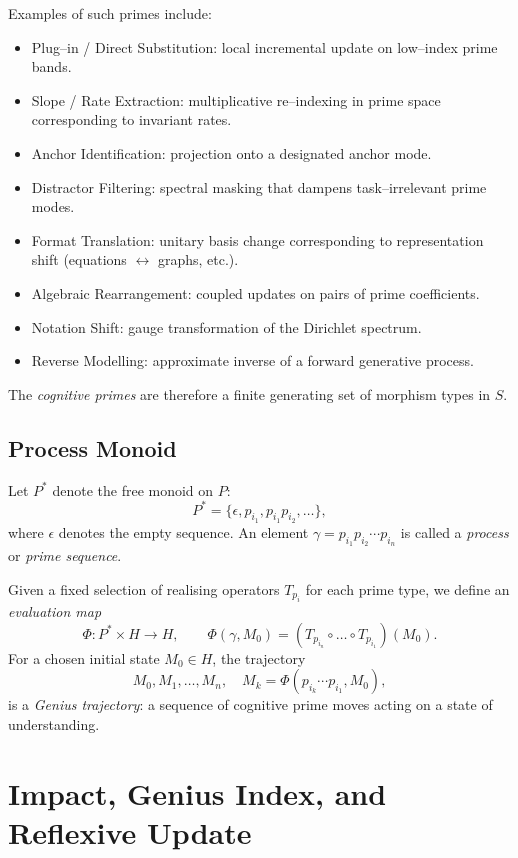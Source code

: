\documentclass[11pt]{article}
\begin{document}
Examples of such primes include:
\begin{itemize}[nosep]
  \item Plug--in / Direct Substitution: local incremental update on low--index prime bands.
  \item Slope / Rate Extraction: multiplicative re--indexing in prime space corresponding to invariant rates.
  \item Anchor Identification: projection onto a designated anchor mode.
  \item Distractor Filtering: spectral masking that dampens task--irrelevant prime modes.
  \item Format Translation: unitary basis change corresponding to representation shift (equations $\leftrightarrow$ graphs, etc.).
  \item Algebraic Rearrangement: coupled updates on pairs of prime coefficients.
  \item Notation Shift: gauge transformation of the Dirichlet spectrum.
  \item Reverse Modelling: approximate inverse of a forward generative process.
\end{itemize}

The \emph{cognitive primes} are therefore a finite generating set of morphism types in $S$.

\subsection{Process Monoid}

Let $P^\ast$ denote the free monoid on $P$:
\[
P^\ast = \{\epsilon, p_{i_1}, p_{i_1}p_{i_2}, \dots\},
\]
where $\epsilon$ denotes the empty sequence.
An element $\gamma = p_{i_1}p_{i_2}\cdots p_{i_n}$ is called a \emph{process} or \emph{prime sequence}.

Given a fixed selection of realising operators $T_{p_i}$ for each prime type,
we define an \emph{evaluation map}
\[
\Phi: P^\ast \times H \to H,\qquad
\Phi(\gamma, M_0) = \left(T_{p_{i_n}} \circ \dots \circ T_{p_{i_1}}\right)(M_0).
\]
For a chosen initial state $M_0\in H$, the trajectory
\[
M_0, M_1, \dots, M_n,\quad M_k = \Phi(p_{i_k}\cdots p_{i_1}, M_0),
\]
is a \emph{Genius trajectory}: a sequence of cognitive prime moves acting on a state of understanding.

\section{Impact, Genius Index, and Reflexive Update}
\end{document}
